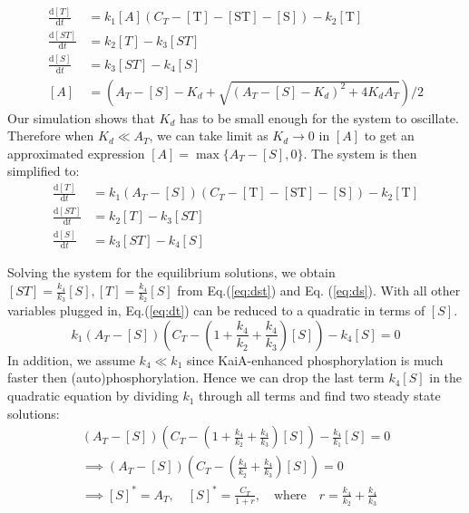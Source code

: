 \documentclass[a4paper,10pt]{article}
\numberwithin{equation}{section}
\begin{document}
\begin{align*}
\frac{\mathrm{d}[T]}{\mathrm{d}t}&=k_1 [A] (C_T-\mathrm{[T]}-\mathrm{[ST]}-\mathrm{[S]})-k_2 \mathrm{[T]}\\
\frac{\mathrm{d}[ST]}{\mathrm{d}t}&=k_2 [T]-k_3 [ST]\\
\frac{\mathrm{d}[S]}{\mathrm{d}t}&=k_3 [ST]-k_4 [S]\\
[A]&=\left(A_T-[S]-K_d+\sqrt{(A_T-[S]-K_d)^2+4K_dA_T}\right)/2
\end{align*}
Our simulation shows that $K_d$ has to be small enough for the system to oscillate. Therefore when $K_d\ll A_T$, we can take limit as $K_d\to 0$ in $[A]$ to get an approximated expression $[A]=\max\{ A_T-[S],0 \}$.
The system is then simplified to:
\begin{align}
\frac{\mathrm{d}[T]}{\mathrm{d}t}&=k_1 (A_T-[S]) (C_T-\mathrm{[T]}-\mathrm{[ST]}-\mathrm{[S]})-k_2 \mathrm{[T]}\label{eq:dt}\\
\frac{\mathrm{d}[ST]}{\mathrm{d}t}&=k_2 [T]-k_3 [ST]\label{eq:dst}\\
\frac{\mathrm{d}[S]}{\mathrm{d}t}&=k_3 [ST]-k_4 [S]\label{eq:ds}
\end{align}

Solving the system for the equilibrium solutions, we obtain $[ST]=\frac{k_4}{k_3} [S],[T]=\frac{k_4}{k_2}  [S]$ from Eq.(\ref{eq:dst}) and Eq. (\ref{eq:ds}). With all other variables plugged in, Eq.(\ref{eq:dt}) can be reduced to a quadratic in terms of $[S]$.
\[k_1(A_T-[S])(C_T-(1+\frac{k_4}{k_2}+\frac{k_4}{k_3})[S])-k_4[S]=0\] 
In addition, we assume $k_4\ll k_1$ since KaiA-enhanced phosphorylation is much faster then (auto)phosphorylation. Hence we can drop the last term $k_4[S]$ in the quadratic equation by dividing $k_1$ through all terms and find two steady state solutions:
\begin{gather*}
(A_T-[S])(C_T-(1+\frac{k_4}{k_2}+\frac{k_4}{k_3})[S])-\frac{k_4}{k_1}[S]=0\\
\implies
(A_T-[S])(C_T-(\frac{k_4}{k_2}+\frac{k_4}{k_3})[S])=0\\
\implies [S]^*=A_T, \quad [S]^*=\frac{C_T}{1+r}, \quad \mathrm{where}\quad r=\frac{k_4}{k_2}+\frac{k_4}{k_3}
\end{gather*}
\end{document}
